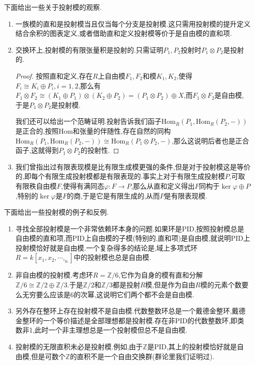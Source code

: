 下面给出一些关于投射模的观察.
\begin{enumerate}
	\item 一族模的直和是投射模当且仅当每个分支是投射模.这只需用投射模的提升定义结合余积的图表定义,或者借助直和定义投射模等价于是自由模的直和项.
    \item 交换环上,投射模的有限张量积是投射的.只需证明$P_1,P_2$投射时$P_1\otimes P_2$是投射的.
    \begin{proof}
	
	按照直和定义,存在$R$上自由模$F_1,F_2$和模$K_1,K_2$,使得$F_i\cong K_i\oplus P_i,i=1,2$,那么有$F_1\otimes F_2\cong(K_1\oplus P_1)\otimes(K_2\oplus P_2)=(P_1\otimes P_2)\oplus X$,而$F_1\otimes F_2$是自由模,于是$P_1\otimes P_2$是投射模.
	
	我们还可以给出一个范畴证明.投射告诉我们函子$\mathrm{Hom}_R(P_1,\mathrm{Hom}_R(P_2,-))$是正合的,按照Hom和张量的伴随性,存在自然的同构$\mathrm{Hom}_R(P_1,\mathrm{Hom}_R(P_2,-))\cong \mathrm{Hom}_R(P_1\otimes P_2,-)$,那么这说明后者也是正合函子,这就得到$P_1\otimes P_2$的投射性.
    \end{proof}
    \item 我们曾指出过有限表现模是比有限生成模更强的条件,但是对于投射模这是等价的,即每个有限生成投射模都是有限表现的.事实上对于有限生成投射模$P$,可取有限秩自由模$F$,使得有满同态$\varphi:F\to P$,那么从直和定义得出$F$同构于$\ker\varphi\oplus P$,特别的$\ker\varphi$是$F$的商,于是它是有限生成的,从而$P$是有限表现模.
\end{enumerate}

下面给出一些投射模的例子和反例.
\begin{enumerate}
	\item 寻找全部投射模是一个非常依赖环本身的问题.如果环是PID,按照投射模总是自由模的直和项,而PID上自由模的子模(特别的,直和项)是自由模,就说明PID上投射模恰好就是自由模.一个复杂得多的结论是,域上多项式环$R=k[x_1,x_2,\cdots,_n]$中的投射模也总是自由模.
	\item 非自由模的投射模.考虑环$R=\mathbb{Z}/6$,它作为自身的模有直和分解$\mathbb{Z}/6\cong\mathbb{Z}/2\oplus\mathbb{Z}/3$.于是$\mathbb{Z}/2$和$\mathbb{Z}/3$都是投射$R$模,但是作为自由$R$模的元素个数要么无穷要么应该是6的次幂,这说明它们两个都不会是自由模.
	\item 另外存在整环上存在投射模不是自由模.代数整数环总是一个戴德金整环,戴德金整环的一个等价描述是全部理想都是投射模.存在非PID的代数整数环,即类数非1,此时一个非主理想总是一个投射模但总不是自由模.
	\item 投射模的无限直积未必是投射模.例如,由于$\mathbb{Z}$是PID,其上的投射模恰好就是自由模,但是可数个$\mathbb{Z}$的直积不是一个自由交换群(群论里我们证明过).
\end{enumerate}


